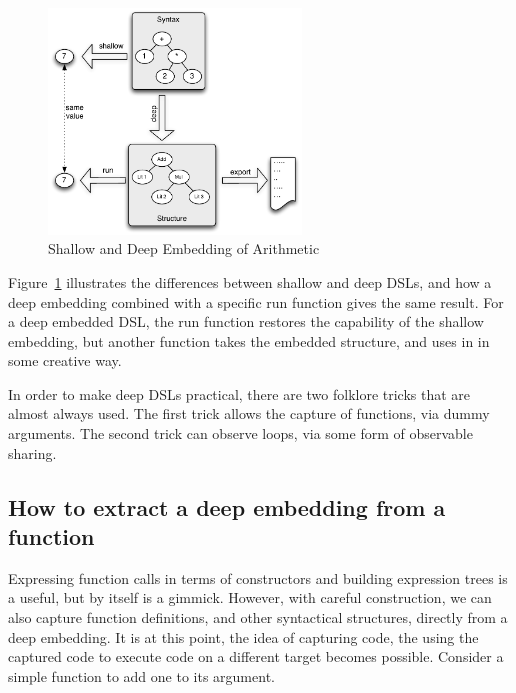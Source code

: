 \documentclass[11pt]{article}
\begin{document}
\begin{figure}[!t]
  \centering        
  \includegraphics[width=0.6\textwidth]{images/DeepEmbedding.pdf}
  \caption{Shallow and Deep Embedding of Arithmetic}
  \label{fig:deep-dsls}
\end{figure}

Figure~\ref{fig:deep-dsls} illustrates the differences between shallow and deep DSLs,
and how a deep embedding combined with a specific run function gives the same result.
For a deep embedded DSL, the run function restores the capability of the shallow
embedding, but another function takes the embedded structure, and uses in in some creative way. 

In order to make deep DSLs practical, there are two folklore tricks that are almost
always used.
The first trick allows the capture of functions, via dummy arguments. The second trick can observe loops,
via some form of observable sharing. 

\subsection{How to extract a deep embedding from a function}

Expressing function calls in terms of constructors and
building expression trees is a useful, but by itself is a gimmick. 
However, with careful construction, we can also capture function definitions,
and other syntactical structures,
directly from a deep embedding. It is at this
point, the idea of capturing code,
the using the captured code to execute code
on a different target becomes possible.
Consider a simple function to add one to its argument.
\end{document}
